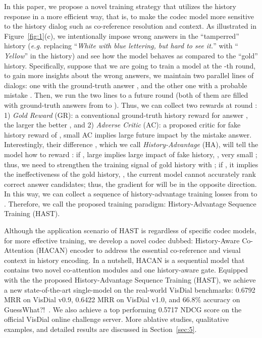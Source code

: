 \documentclass[10pt,twocolumn,letterpaper]{article}
\begin{document}
In this paper, we propose a novel training strategy that utilizes the history response in a more efficient way, that is, to make the codec model more sensitive to the history dialog such as co-reference resolution and context. As illustrated in Figure~\ref{fig:1}(c), we intentionally impose wrong answers in the ``tamperred'' history (\emph{e.g.} replacing ``\emph{White with blue lettering, but hard to see it.}'' with ``\emph{ Yellow}'' in the history) and see how the model behaves as compared to the ``gold'' history. Specifically, suppose that we are going to train a model at the -th round, to gain more insights about the wrong answers, we maintain two parallel lines of dialogs: one with the ground-truth answer , and the other one with a probable mistake . Then, we run the two lines to a future round  (both of them are filled with ground-truth answers from  to ). Thus, we can collect two rewards at round : 1) \emph{Gold Reward} (GR): a conventional ground-truth history reward for answer , the larger the better , and 2) \emph{Adverse Critic} (AC): a proposed critic for fake history reward of , small AC implies large future impact by the mistake answer. Interestingly, their difference , which we call \textit{History-Advantage} (HA), will tell the model how to reward : if , large  implies large impact of fake history, \ie, very small ; thus, we need to strengthen the training signal of gold history with ; if , it implies the ineffectiveness of the gold history, \ie, the current model cannot accurately rank correct answer candidates; thus, the gradient for  will be in the opposite direction. In this way, we can collect a sequence of history-advantage training losses from  to . Therefore, we call the proposed training paradigm: History-Advantage Sequence Training (HAST).

Although the application scenario of HAST is regardless of specific codec models, for more effective training, we develop a novel codec dubbed: History-Aware Co-Attention (HACAN) encoder to address the essential co-reference and visual context in history encoding. In a nutshell, HACAN is a sequential model that contains two novel co-attention modules and one history-aware gate. Equipped with the the proposed History-Advantage Sequence Training (HAST), we achieve a new state-of-the-art single-model on the real-world VisDial benchmarks: 0.6792 MRR on VisDial v0.9, 0.6422 MRR on  VisDial v1.0, and 66.8\% accuracy on GuessWhat?!~\cite{de2017guesswhat}. We also achieve a top performing 0.5717 NDCG score on the official VisDial online challenge server. More ablative studies, qualitative examples, and detailed results are discussed in Section~\ref{sec:5}.
\end{document}
